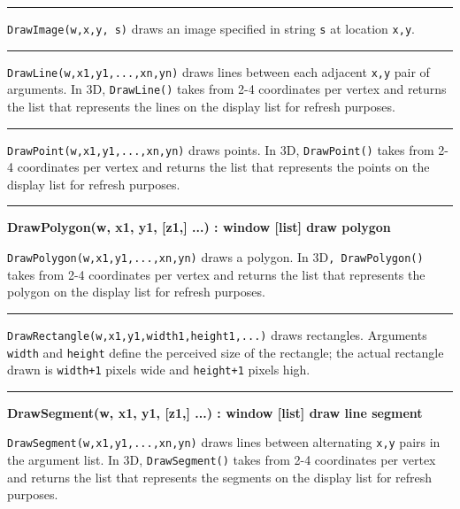 \bigskip\hrule\vspace{0.1cm}

\noindent
\texttt{DrawImage(w,x,y, s)} draws an image specified in string
\texttt{s} at location \texttt{x,y}.

\bigskip\hrule\vspace{0.1cm}

\noindent
\texttt{DrawLine(w,x1,y1,...,xn,yn)} draws lines between each adjacent
\texttt{x,y} pair of arguments. In 3D, \texttt{DrawLine()} takes from
2-4 coordinates per vertex and returns the list that represents the
lines on the display list for refresh purposes.

\bigskip\hrule\vspace{0.1cm}

\noindent
\texttt{DrawPoint(w,x1,y1,...,xn,yn)} draws points. In 3D,
\texttt{DrawPoint()} takes from 2-4 coordinates per vertex and returns
the list that represents the points on the display list for refresh
purposes.

\bigskip\hrule\vspace{0.1cm}
\noindent
{\bf DrawPolygon(w, x1, y1, [z1,] ...) : window [list] \hfill draw polygon}

\noindent
\texttt{DrawPolygon(w,x1,y1,...,xn,yn)} draws a polygon. In 3D\texttt{,
DrawPolygon()} takes from 2-4 coordinates per vertex and returns the
list that represents the polygon on the display list for refresh
purposes.

\bigskip\hrule\vspace{0.1cm}

\noindent
\texttt{DrawRectangle(w,x1,y1,width1,height1,...)} draws rectangles.
Arguments \texttt{width} and \texttt{height} define the perceived size
of the rectangle; the actual rectangle drawn is \texttt{width+1} pixels
wide and \texttt{height+1} pixels high.

\bigskip\hrule\vspace{0.1cm}
\noindent
{\bf DrawSegment(w, x1, y1, [z1,] ...) : window [list] \hfill draw line segment}

\noindent
\texttt{DrawSegment(w,x1,y1,...,xn,yn)} draws lines between alternating
\texttt{x,y} pairs in the argument list. In 3D, \texttt{DrawSegment()}
takes from 2-4 coordinates per vertex and returns the list that
represents the segments on the display list for refresh purposes.

